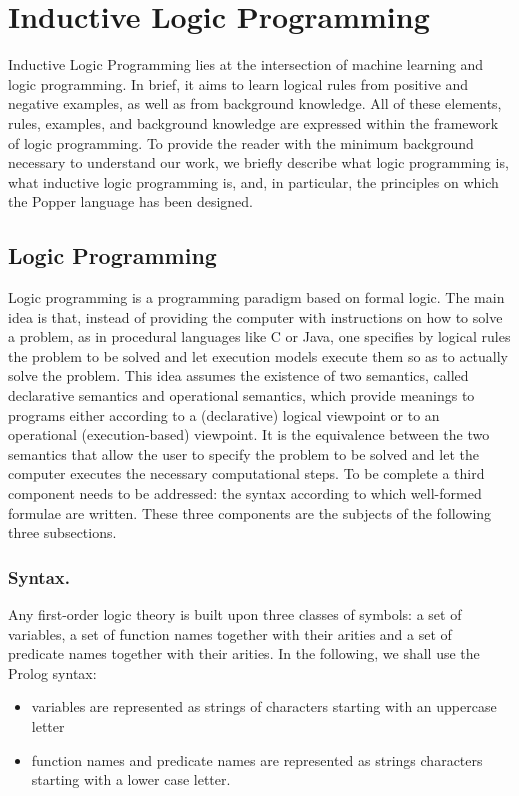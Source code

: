 \section{Inductive Logic Programming}
\label{section-popper}
\label{sect-ilp}

Inductive Logic Programming lies at the intersection of machine learning and logic programming. In brief, it aims to learn logical
rules from positive and negative examples, as well as from background knowledge. All of these elements, rules, examples, and background
knowledge are expressed within the framework of logic programming. To provide the reader with the minimum background necessary to understand
our work, we briefly describe what logic programming is, what inductive logic programming is, and, in particular, the principles on
which the Popper language has been designed.

\subsection{Logic Programming}
Logic programming is a programming paradigm based on formal logic. The main idea is that, instead of providing the computer with instructions on how to solve a problem, as in procedural languages like C or Java, one specifies by logical rules the problem to be solved and let execution models execute them so as to actually solve the problem. This idea assumes the existence of two semantics, called declarative semantics and operational semantics, which provide meanings to programs either according to a (declarative) logical viewpoint or to an operational (execution-based) viewpoint. It is the equivalence between the two semantics that allow the user to specify the problem to be solved and let the computer executes the necessary computational steps. To be complete a third component needs to be addressed: the syntax according to which well-formed formulae are written. These three components are the subjects of the following
three subsections.

\subsubsection{Syntax.}
Any first-order logic theory is built upon three classes of symbols: a set of variables, a set of function names together with their arities
and a set of predicate names together with their arities. In the following, we shall use the Prolog syntax:

\begin{itemize}

\item variables are represented as strings of characters starting with an uppercase letter
\item function names and predicate names are represented as strings characters starting with a lower case letter.
  
\end{itemize}

